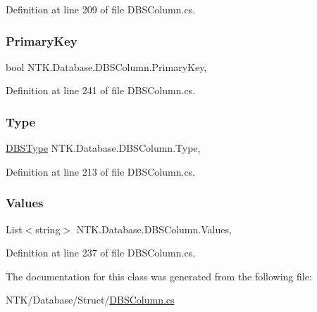 Definition at line 209 of file D\+B\+S\+Column.\+cs.

\mbox{\label{class_n_t_k_1_1_database_1_1_d_b_s_column_a39dd2413f2633e82814f37bc0349b56a}} 
\subsubsection{\texorpdfstring{PrimaryKey}{PrimaryKey}}
{\footnotesize\ttfamily bool N\+T\+K.\+Database.\+D\+B\+S\+Column.\+Primary\+Key\hspace{0.3cm}{\ttfamily [get]}, {\ttfamily [set]}}







Definition at line 241 of file D\+B\+S\+Column.\+cs.

\mbox{\label{class_n_t_k_1_1_database_1_1_d_b_s_column_af5d72ac78c47fe71c1afeb68da6d5c1d}} 
\subsubsection{\texorpdfstring{Type}{Type}}
{\footnotesize\ttfamily \mbox{\hyperlink{namespace_n_t_k_1_1_database_ae934a2911c3962eb3163e7e1758e8a01}{D\+B\+S\+Type}} N\+T\+K.\+Database.\+D\+B\+S\+Column.\+Type\hspace{0.3cm}{\ttfamily [get]}, {\ttfamily [set]}}







Definition at line 213 of file D\+B\+S\+Column.\+cs.

\mbox{\label{class_n_t_k_1_1_database_1_1_d_b_s_column_a5af99313882afb72ae0cacf72855d77d}} 
\subsubsection{\texorpdfstring{Values}{Values}}
{\footnotesize\ttfamily List$<$string$>$ N\+T\+K.\+Database.\+D\+B\+S\+Column.\+Values\hspace{0.3cm}{\ttfamily [get]}, {\ttfamily [set]}}







Definition at line 237 of file D\+B\+S\+Column.\+cs.



The documentation for this class was generated from the following file\+:\begin{DoxyCompactItemize}
\item 
N\+T\+K/\+Database/\+Struct/\mbox{\hyperlink{_d_b_s_column_8cs}{D\+B\+S\+Column.\+cs}}\end{DoxyCompactItemize}
